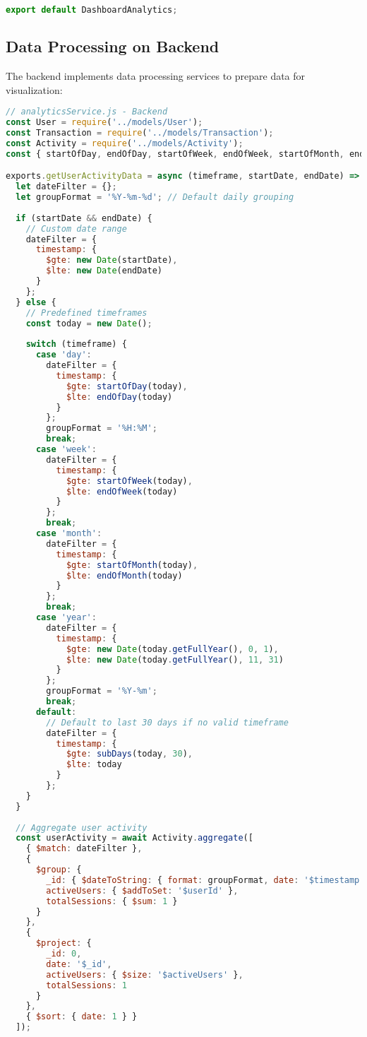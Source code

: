 \documentclass[12pt,a4paper]{article}
\begin{document}
\begin{lstlisting}[language=JavaScript]
export default DashboardAnalytics;
\end{lstlisting}

\subsection{Data Processing on Backend}
The backend implements data processing services to prepare data for visualization:

\begin{lstlisting}[language=JavaScript]
// analyticsService.js - Backend
const User = require('../models/User');
const Transaction = require('../models/Transaction');
const Activity = require('../models/Activity');
const { startOfDay, endOfDay, startOfWeek, endOfWeek, startOfMonth, endOfMonth, subDays, format } = require('date-fns');

exports.getUserActivityData = async (timeframe, startDate, endDate) => {
  let dateFilter = {};
  let groupFormat = '%Y-%m-%d'; // Default daily grouping
  
  if (startDate && endDate) {
    // Custom date range
    dateFilter = {
      timestamp: {
        $gte: new Date(startDate),
        $lte: new Date(endDate)
      }
    };
  } else {
    // Predefined timeframes
    const today = new Date();
    
    switch (timeframe) {
      case 'day':
        dateFilter = {
          timestamp: {
            $gte: startOfDay(today),
            $lte: endOfDay(today)
          }
        };
        groupFormat = '%H:%M';
        break;
      case 'week':
        dateFilter = {
          timestamp: {
            $gte: startOfWeek(today),
            $lte: endOfWeek(today)
          }
        };
        break;
      case 'month':
        dateFilter = {
          timestamp: {
            $gte: startOfMonth(today),
            $lte: endOfMonth(today)
          }
        };
        break;
      case 'year':
        dateFilter = {
          timestamp: {
            $gte: new Date(today.getFullYear(), 0, 1),
            $lte: new Date(today.getFullYear(), 11, 31)
          }
        };
        groupFormat = '%Y-%m';
        break;
      default:
        // Default to last 30 days if no valid timeframe
        dateFilter = {
          timestamp: {
            $gte: subDays(today, 30),
            $lte: today
          }
        };
    }
  }
  
  // Aggregate user activity
  const userActivity = await Activity.aggregate([
    { $match: dateFilter },
    {
      $group: {
        _id: { $dateToString: { format: groupFormat, date: '$timestamp' } },
        activeUsers: { $addToSet: '$userId' },
        totalSessions: { $sum: 1 }
      }
    },
    {
      $project: {
        _id: 0,
        date: '$_id',
        activeUsers: { $size: '$activeUsers' },
        totalSessions: 1
      }
    },
    { $sort: { date: 1 } }
  ]);
  

\end{lstlisting}
\end{document}
